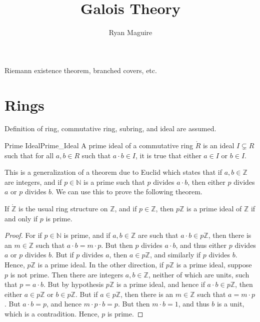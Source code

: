 \documentclass{article}                                                        %
\begin{document}
    \title{Galois Theory}
    \author{Ryan Maguire}
    \date{\vspace{-5ex}}
    \maketitle
    \tableofcontents
    Riemann existence theorem, branched covers, etc.
    \section{Rings}
        Definition of ring, commutative ring, subring, and ideal are assumed.
        \begin{fdefinition}{Prime Ideal}{Prime_Ideal}
            A prime ideal of a commutative ring $\ring{R}$ is an ideal
            $I\subsetneq{R}$ such that for all $a,b\in{R}$ such that
            $a\cdot{b}\in{I}$, it is true that either $a\in{I}$ or $b\in{I}$.
        \end{fdefinition}
        This is a generalization of a theorem due to Euclid which states that if
        $a,b\in\mathbb{Z}$ are integers, and if $p\in\mathbb{N}$ is a prime such
        that $p$ divides $a\cdot{b}$, then either $p$ divides $a$ or $p$ divides
        $b$. We can use this to prove the following theorem.
        \begin{theorem}
            \label{thm:Prime_Ideals_of_Z}%
            If $\ring{\mathbb{Z}}$ is the usual ring structure on $\mathbb{Z}$,
            and if $p\in\mathbb{Z}$, then $p\mathbb{Z}$ is a prime ideal of
            $\mathbb{Z}$ if and only if $p$ is prime.
        \end{theorem}
        \begin{proof}
            For if $p\in\mathbb{N}$ is prime, and if $a,b\in\mathbb{Z}$ are such
            that $a\cdot{b}\in{p}\mathbb{Z}$, then there is an $m\in\mathbb{Z}$
            such that $a\cdot{b}=m\cdot{p}$. But then $p$ divides $a\cdot{b}$,
            and thus either $p$ divides $a$ or $p$ divides $b$. But if $p$
            divides $a$, then $a\in{p}\mathbb{Z}$, and similarly if $p$ divides
            $b$. Hence, $p\mathbb{Z}$ is a prime ideal. In the other direction,
            if $p\mathbb{Z}$ is a prime ideal, suppose $p$ is not prime. Then
            there are integers $a,b\in\mathbb{Z}$, neither of which are units,
            such that $p=a\cdot{b}$. But by hypothesis $p\mathbb{Z}$ is a prime
            ideal, and hence if $a\cdot{b}\in{p}\mathbb{Z}$, then either
            $a\in{p}\mathbb{Z}$ or $b\in{p}\mathbb{Z}$. But if
            $a\in{p}\mathbb{Z}$, then there is an $m\in\mathbb{Z}$ such that
            $a=m\cdot{p}$. But $a\cdot{b}=p$, and hence $m\cdot{p}\cdot{b}=p$.
            But then $m\cdot{b}=1$, and thus $b$ is a unit, which is a
            contradition. Hence, $p$ is prime.
        \end{proof}
\end{document}
